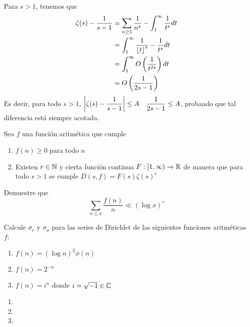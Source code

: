 \begin{sol}
    Para $s>1$, tenemos que
    \begin{align*}
        \zeta(s) - \dfrac{1}{s-1} &= \sum_{n \geq 1} \dfrac{1}{n^s} - \int_1^\infty \dfrac{1}{t^s} dt\\
        &= \int_1^\infty \dfrac{1}{\left\lfloor t\right\rfloor^s} - \dfrac{1}{t^s} dt\\
        &= \int_1^\infty O\left(\dfrac{1}{t^{2s}}\right) dt\\
        &= O\left(\dfrac{1}{2s-1}\right)
    \end{align*}
    Es decir, para todo $s>1$, $\left|\zeta(s) - \dfrac{1}{s-1}\right| \leq A\quad\dfrac{1}{2s-1} \leq A$, probando que tal diferencia está siempre acotada.
\end{sol}
\begin{prob}[2 pts.]
    Sea $f$ una función aritmética que cumple
    \begin{enumerate}[label = (\roman*)]
        \item  $f(n)\geq 0$ para todo $n$

        \item Existen $r\in\mathbb{N}$ y cierta función continua $F:[1,\infty)\xrightarrow[]{}\mathbb{R}$ de manera que para todo $s>1$ se cumple $D(s,f)=F(s)\zeta(s)^r$
    \end{enumerate}
    Demuestre que
    \[\sum_{n\leq x}\frac{f(n)}{n}\ll(\log x)^r\]
\end{prob}

\begin{sol}
    
\end{sol}

\begin{prob}[2 pts. c/u]
    Calcule $\sigma_c$ y $\sigma_a$ para las series de Dirichlet de las siguientes funciones aritméticas $f$:
    \begin{enumerate}[label = (\roman*)]
        \item $f(n)=(\log n)^2\phi(n)$

        \item $f(n)=2^{-n}$

        \item $f(n)=i^n$ donde $i=\sqrt{-1}\in\mathbb{C}$
    \end{enumerate}
\end{prob}

\begin{sol}
    \begin{enumerate}[label = (\roman*)]
        \item 

        \item 

        \item
    \end{enumerate}
\end{sol}

